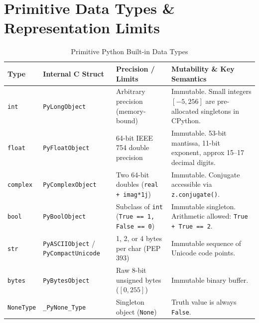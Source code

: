 \section{Primitive Data Types \& Representation Limits}
\begin{table}[htbp]
\centering
\small
\begin{tabularx}{\linewidth}{l p{3.2cm} p{2.8cm} X}
\toprule
\textbf{Type} & \textbf{Internal C Struct} & \textbf{Precision / Limits} & \textbf{Mutability \& Key Semantics} \\
\midrule
\texttt{int} & \texttt{PyLongObject} & Arbitrary precision (memory-bound) & Immutable. Small integers $[-5, 256]$ are pre-allocated singletons in CPython. \\
\texttt{float} & \texttt{PyFloatObject} & 64-bit IEEE 754 double precision & Immutable. 53-bit mantissa, 11-bit exponent, approx 15--17 decimal digits. \\
\texttt{complex} & \texttt{PyComplexObject} & Two 64-bit doubles (\texttt{real + imag*1j}) & Immutable. Conjugate accessible via \texttt{z.conjugate()}. \\
\texttt{bool} & \texttt{PyBoolObject} & Subclass of \texttt{int} (\texttt{True == 1, False == 0}) & Immutable singleton. Arithmetic allowed: \texttt{True + True == 2}. \\
\texttt{str} & \texttt{PyASCIIObject} / \texttt{PyCompactUnicode} & 1, 2, or 4 bytes per char (PEP 393) & Immutable sequence of Unicode code points. \\
\texttt{bytes} & \texttt{PyBytesObject} & Raw 8-bit unsigned bytes ($[0, 255]$) & Immutable binary buffer. \\
\texttt{NoneType}& \texttt{\_PyNone\_Type} & Singleton object (\texttt{None}) & Truth value is always \texttt{False}. \\
\bottomrule
\end{tabularx}
\caption{Primitive Python Built-in Data Types}
\end{table}

